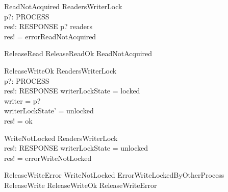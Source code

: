 \documentclass{article}
\begin{document}
\begin{schema}{ReadNotAcquired}
    \Xi ReadersWriterLock \\
    p?: PROCESS \\
    res!: RESPONSE
\where
    p? \notin readers \\
    res! = errorReadNotAcquired
\end{schema}

\begin{zed}
ReleaseRead  ReleaseReadOk \lor ReadNotAcquired
\end{zed}

\begin{schema}{ReleaseWriteOk}
    \Delta ReadersWriterLock \\
    p?: PROCESS \\
    res!: RESPONSE
\where
    writerLockState = locked \\
    writer = p? \\
    writerLockState' = unlocked \\
    res! = ok
\end{schema}

\begin{schema}{WriteNotLocked}
    \Xi ReadersWriterLock \\
    res!: RESPONSE
\where
    writerLockState = unlocked \\
    res! = errorWriteNotLocked
\end{schema}

\begin{zed}
ReleaseWriteError  WriteNotLocked \lor ErrorWriteLockedByOtherProcess 
\also
ReleaseWrite  ReleaseWriteOk \lor ReleaseWriteError
\end{zed}
\end{document}
